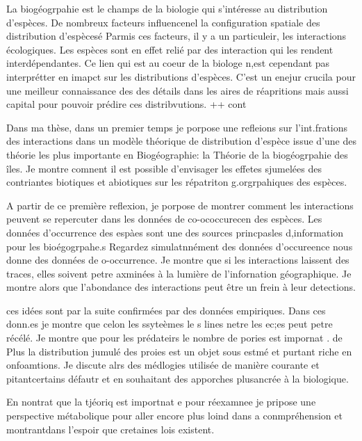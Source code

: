 La biogéogrpahie est le champs de la biologie qui s'intéresse au
distribution d'espèces. De nombreux facteurs influencenel la
configuration spatiale des distribution d'espècesé Parmis ces facteurs,
il y a un particuleir, les interactions écologiques. Les espèces sont en
effet relié par des interaction qui les rendent interdépendantes. Ce
lien qui est au coeur de la biologe n,est cependant pas interprétter en
imapct sur les distributions d'espèces. C'est un enejur crucila pour une
meilleur connaissance des des détails dans les aires de réapritions mais
aussi capital pour pouvoir prédire ces distribvutions. ++ cont

Dans ma thèse, dans un premier temps je porpose une refleions sur
l'int.frations des interactions dans un modèle théorique de distribution
d'espèce issue d'une des théorie les plus importante en Biogéographie:
la Théorie de la biogéogrpahie des îles. Je montre comnent il est
possible d'envisager les effetes sjumelées des contriantes biotiques et
abiotiques sur les répatriton g.orgrpahiques des espèces.

A partir de ce première reflexion, je porpose de montrer comment les
interactions peuvent se repercuter dans les données de co-ococcurecen
des espèces. Les données d'occurrence des espàes sont une des sources
princpasles d,information pour les bioégogrpahe.s Regardez
simulatnnément des données d'occureence nous donne des données de
o-occurrence. Je montre que si les interactions laissent des traces,
elles soivent petre axminées à la lumière de l'infornation géographique.
Je montre alors que l'abondance des interactions peut être un frein à
leur detections.

ces idées sont par la suite confirmées par des données empiriques. Dans
ces donn.es je montre que celon les ssyteèmes le s lines netre les ec;es
peut petre récélé. Je montre que pour les prédateirs le nombre de pories
est impornat . de Plus la distribution jumulé des proies est un objet
sous estmé et purtant riche en onfoamtions. Je discute alrs des
médlogies utilisée de manière courante et pitantcertains défautr et en
souhaitant des apporches plusancrée à la biologique.

En nontrat que la tjéoriq est importnat e pour réexamnee je pripose une
perspective métabolique pour aller encore plus loind dans a
conmpréhension et montrantdans l'espoir que cretaines lois existent.
